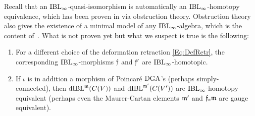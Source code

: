 \documentclass[\MainFolder/Text.tex]{subfiles}
\begin{document}
Recall that an $\mathrm{IBL}_\infty$-quasi-isomorphism is automatically an $\mathrm{IBL}_\infty$-homotopy equivalence, which has been proven in \cite[Theorem~1.2]{Cieliebak2015} via obstruction theory. Obstruction theory also gives the existence of a minimal model of any $\mathrm{IBL}_\infty$-algebra, which is the content of~\cite[Theorem~1.3]{Cieliebak2015}. What is not proven yet but what we suspect is true is the following:
\begin{enumerate}[label=(\arabic*)]
 \item For a different choice of the deformation retraction \eqref{Eq:DefRetr}, the corresponding $\mathrm{IBL}_\infty$-morphisms $\mathfrak{f}$ and $\mathfrak{f}'$ are $\mathrm{IBL}_\infty$-homotopic.
 \item If $\iota$ is in addition a morphism of Poincar\'e $\mathrm{DGA}$'s (perhaps simply-connected), then $\mathrm{dIBL}^{\mathfrak{m}}(C(V))$ and $\mathrm{dIBL}^{\mathfrak{m}'}(C(V'))$ are $\mathrm{IBL}_\infty$-homotopy equivalent (perhaps even the Maurer-Cartan elements $\mathfrak{m}'$ and $\mathfrak{f}_{*}\mathfrak{m}$ are gauge equivalent).
\end{enumerate}
\end{document}

